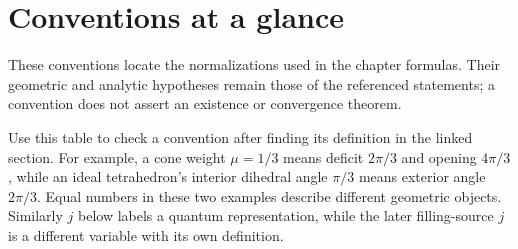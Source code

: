 \section{Conventions at a glance}
\label{app:conventions}

These conventions locate the normalizations used in the chapter formulas.
Their geometric and analytic hypotheses remain those of the referenced
statements; a convention does not assert an existence or convergence theorem.

Use this table to check a convention after finding its definition
in the linked section. For example, a cone weight $\mu=1/3$
means deficit $2\pi/3$ and opening $4\pi/3$, while an ideal
tetrahedron's interior dihedral angle $\pi/3$ means exterior
angle $2\pi/3$. Equal numbers in these two examples describe
different geometric objects. Similarly $j$ below labels a
quantum representation, while the later filling-source $j$
is a different variable with its own definition.


